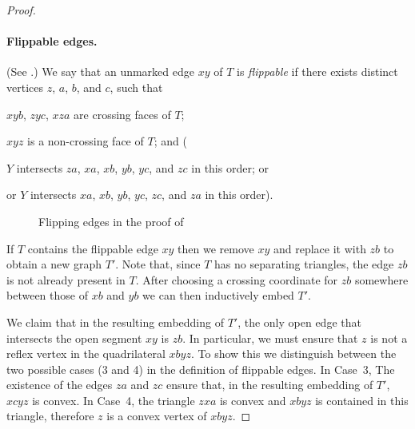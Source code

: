 \documentclass{patmorin}
\begin{document}
\begin{proof}

   \paragraph{Flippable edges.}
   (See .)
   We say that an unmarked edge $xy$ of $T$ is \emph{flippable} if there
   exists distinct vertices $z$, $a$, $b$, and $c$, such that 
   \begin{compactenum}
      \item $xyb$, $zyc$, $xza$ are crossing faces of $T$;
      \item $xyz$ is a non-crossing face of $T$; and (
      \item $Y$ intersects $za$, $xa$, $xb$, $yb$, $yc$, and $zc$ in this order; or 
      \item or $Y$ intersects $xa$, $xb$, $yb$, $yc$, $zc$, and $za$ in this order).  
   \end{compactenum}
   \begin{figure}
      \caption{Flipping edges in the proof of
      }
   \end{figure}

   If $T$ contains the flippable edge $xy$ then we remove $xy$ and replace
   it with $zb$ to obtain a new graph $T'$.  Note that, since $T$ has
   no separating triangles, the edge $zb$ is not already present in $T$.
   After choosing a crossing coordinate for $zb$ somewhere between those
   of $xb$ and $yb$ we can then inductively embed $T'$.

   We claim that in the resulting embedding of $T'$, the only open edge
   that intersects the open segment $xy$ is $zb$.  In particular, we must
   ensure that $z$ is not a reflex vertex in the quadrilateral $xbyz$.
   To show this we distinguish between the two possible cases (3 and 4)
   in the definition of flippable edges. In Case~3, The existence of the
   edges $za$ and $zc$ ensure that, in the resulting embedding of $T'$,
   $xcyz$ is convex.  In Case~4, the triangle $zxa$ is convex and $xbyz$
   is contained in this triangle, therefore $z$ is a convex vertex
   of $xbyz$.


\end{proof}
\end{document}
